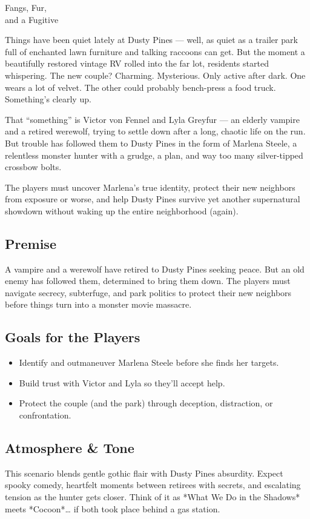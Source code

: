 

\begin{WyrdScenarioHeading}{Fangs, Fur,\\ and a Fugitive}
    \label{scenario:fangs-fur-fugitive}

    Things have been quiet lately at Dusty Pines — well, as quiet as a trailer park full of enchanted lawn furniture and talking raccoons can get. But the moment a beautifully restored vintage RV rolled into the far lot, residents started whispering. The new couple? Charming. Mysterious. Only active after dark. One wears a lot of velvet. The other could probably bench-press a food truck. Something’s clearly up.

    That “something” is Victor von Fennel and Lyla Greyfur — an elderly vampire and a retired werewolf, trying to settle down after a long, chaotic life on the run. But trouble has followed them to Dusty Pines in the form of Marlena Steele, a relentless monster hunter with a grudge, a plan, and way too many silver-tipped crossbow bolts.

    The players must uncover Marlena’s true identity, protect their new neighbors from exposure or worse, and help Dusty Pines survive yet another supernatural showdown without waking up the entire neighborhood (again).

    \subsection*{Premise}
    A vampire and a werewolf have retired to Dusty Pines seeking peace. But an old enemy has followed them, determined to bring them down. The players must navigate secrecy, subterfuge, and park politics to protect their new neighbors before things turn into a monster movie massacre.

    \subsection*{Goals for the Players}
    \begin{itemize}
        \item Identify and outmaneuver Marlena Steele before she finds her targets.
        \item Build trust with Victor and Lyla so they’ll accept help.
        \item Protect the couple (and the park) through deception, distraction, or confrontation.
    \end{itemize}

    \subsection*{Atmosphere \& Tone}
    This scenario blends gentle gothic flair with Dusty Pines absurdity. Expect spooky comedy, heartfelt moments between retirees with secrets, and escalating tension as the hunter gets closer. Think of it as *What We Do in the Shadows* meets *Cocoon*… if both took place behind a gas station.
\end{WyrdScenarioHeading}

